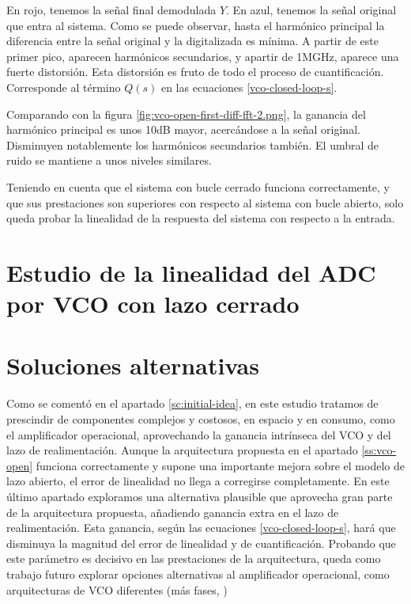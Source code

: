 \documentclass[12pt]{report} %
\begin{document}
	En rojo, tenemos la señal final demodulada $Y$. En azul, tenemos la señal original que entra al sistema. Como se puede observar, hasta el harmónico principal la diferencia entre la señal original y la digitalizada es mínima. A partir de este primer pico, aparecen harmónicos secundarios, y apartir de 1MGHz, aparece una fuerte distorsión. Esta distorsión es fruto de todo el proceso de cuantificación. Corresponde al término $Q(s)$ %
	en las ecuaciones \ref{vco-closed-loop-s}.
	
	Comparando con la figura \ref{fig:vco-open-first-diff-fft-2.png}, la ganancia del harmónico principal es unos 10dB mayor, acercándose a la señal original. Disminuyen notablemente los harmónicos secundarios también. El umbral de ruido se mantiene a unos niveles similares.
	
	Teniendo en cuenta que el sistema con bucle cerrado funciona correctamente, y que sus prestaciones son superiores con respecto al sistema con bucle abierto, solo queda probar la linealidad de la respuesta del sistema con respecto a la entrada.
	
	\section{Estudio de la linealidad del ADC por VCO con lazo cerrado}
	
	\section{Soluciones alternativas}
	
	Como se comentó en el apartado \ref{sc:initial-idea}, en este estudio tratamos de prescindir de componentes complejos y costosos, en espacio y en consumo, como el amplificador operacional, aprovechando la ganancia intrínseca del VCO y del lazo de realimentación. Aunque la arquitectura propuesta en el apartado \ref{ss:vco-open} funciona correctamente y supone una importante mejora sobre el modelo de lazo abierto, el error de linealidad no llega a corregirse completamente. En este último apartado exploramos una alternativa plausible que aprovecha gran parte de la arquitectura propuesta, añadiendo ganancia extra en el lazo de realimentación. Esta ganancia, según las ecuaciones \ref{vco-closed-loop-s}, hará que disminuya la magnitud del error de linealidad y de cuantificación. Probando que este parámetro es decisivo en las prestaciones de la arquitectura, queda como trabajo futuro explorar opciones alternativas al amplificador operacional, como arquitecturas de VCO diferentes (más fases, ) %
	
\end{document}
